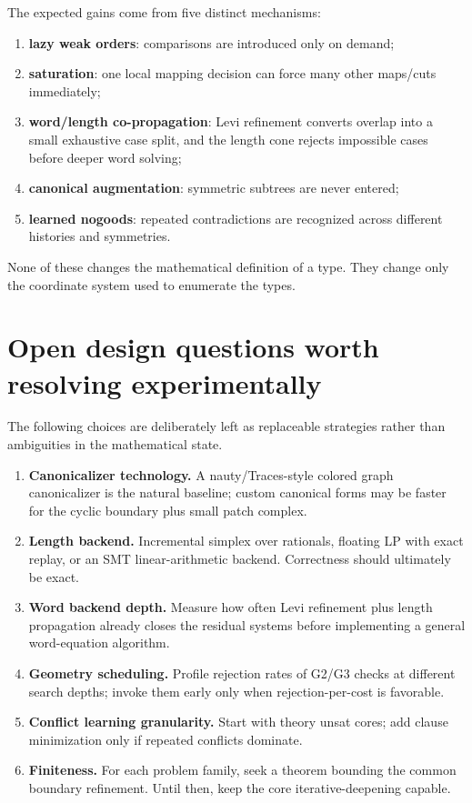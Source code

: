 \documentclass[11pt]{article}
\begin{document}
The expected gains come from five distinct mechanisms:
\begin{enumerate}
  \item \textbf{lazy weak orders}: comparisons are introduced only on demand;
  \item \textbf{saturation}: one local mapping decision can force many other maps/cuts immediately;
  \item \textbf{word/length co-propagation}: Levi refinement converts overlap into a small exhaustive case split, and the length cone rejects impossible cases before deeper word solving;
  \item \textbf{canonical augmentation}: symmetric subtrees are never entered;
  \item \textbf{learned nogoods}: repeated contradictions are recognized across different histories and symmetries.
\end{enumerate}

None of these changes the mathematical definition of a type.  They change only the coordinate system used to enumerate the types.

\section{Open design questions worth resolving experimentally}

The following choices are deliberately left as replaceable strategies rather than ambiguities in the mathematical state.

\begin{enumerate}
  \item \textbf{Canonicalizer technology.}  A nauty/Traces-style colored graph canonicalizer is the natural baseline; custom canonical forms may be faster for the cyclic boundary plus small patch complex.
  \item \textbf{Length backend.}  Incremental simplex over rationals, floating LP with exact replay, or an SMT linear-arithmetic backend.  Correctness should ultimately be exact.
  \item \textbf{Word backend depth.}  Measure how often Levi refinement plus length propagation already closes the residual systems before implementing a general word-equation algorithm.
  \item \textbf{Geometry scheduling.}  Profile rejection rates of G2/G3 checks at different search depths; invoke them early only when rejection-per-cost is favorable.
  \item \textbf{Conflict learning granularity.}  Start with theory unsat cores; add clause minimization only if repeated conflicts dominate.
  \item \textbf{Finiteness.}  For each problem family, seek a theorem bounding the common boundary refinement.  Until then, keep the core iterative-deepening capable.
\end{enumerate}
\end{document}
